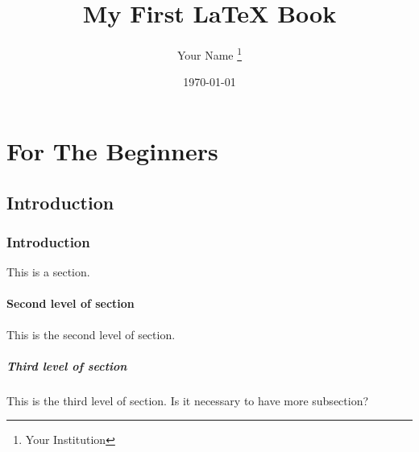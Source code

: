 \documentclass{book}
\title{My First \LaTeX{} Book}
\author{Your Name \thanks{Your Institution}}
\date{\today}
\begin{document}
    \maketitle
    
    \part{For The Beginners}
    
    \chapter{Introduction}
    
    \section{Introduction}
    
    This is a section.
    
    \subsection{Second level of section}
    
    This is the second level of section.
    
    \subsubsection{Third level of section}
    
    This is the third level of section.
    Is it necessary to have more subsection?
    
\end{document}
